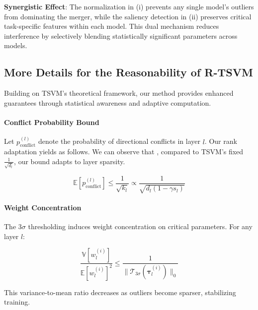 \textbf{Synergistic Effect}: The normalization in (i) prevents any single model's outliers from dominating the merger, while the saliency detection in (ii) preserves critical task-specific features within each model. This dual mechanism reduces interference by selectively blending statistically significant parameters across models.

\subsection{More Details for the Reasonability of R-TSVM}
\label{ssec:analysis}

Building on TSVM's theoretical framework, our method provides enhanced guarantees through statistical awareness and adaptive computation.

\paragraph{Conflict Probability Bound}
Let $p_{\text{conflict}}^{(l)}$ denote the probability of directional conflicts in layer $l$. Our rank adaptation yields as follows. We can observe that , compared to TSVM's fixed $\frac{1}{\sqrt{d_l}}$, our bound adapts to layer sparsity.

\begin{equation}
    \mathbb{E}[p_{\text{conflict}}^{(l)}] \leq \frac{1}{\sqrt{k_l}} \propto \frac{1}{\sqrt{d_l(1-\gamma s_l)}}
\end{equation}

\paragraph{Weight Concentration}
The 3$\sigma$ thresholding induces weight concentration on critical parameters. For any layer $l$:

\begin{equation}
    \frac{\mathbb{V}[w_l^{(i)}]}{\mathbb{E}[w_l^{(i)}]^2} \leq \frac{1}{\|\mathcal{T}_{3\sigma}(\bm{\tau}_l^{(i)})\|_0}
\end{equation}

This variance-to-mean ratio decreases as outliers become sparser, stabilizing training.

